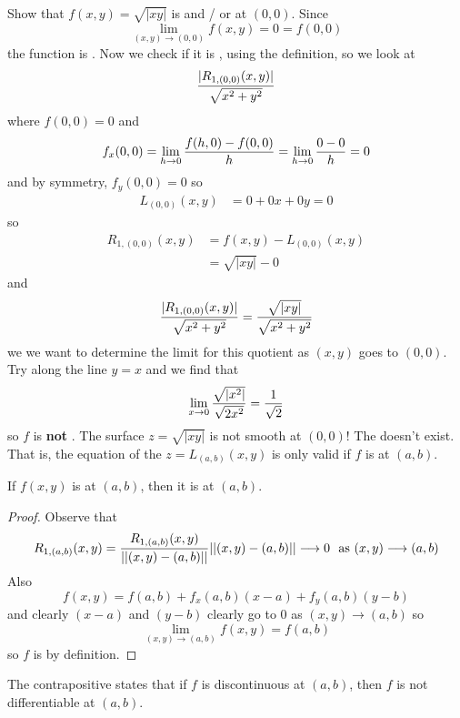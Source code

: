 \documentclass[english, 11pt]{article}
\begin{document}
  \begin{exmp}
    Show that $f(x,y) = \sqrt{|xy|}$ is  and / or  at $(0,0)$. Since
    \[ \lim_{(x,y) \rightarrow (0,0)} f(x,y) = 0 = f(0,0) \]
    the function is . Now we check if it is , using the definition, so we look at
    \[ \frac{|R_{1,(0,0)}(x,y)|}{\sqrt{x^2 + y^2}} \]
    where $f(0,0) = 0$ and
    \[ f_x(0,0) = \lim_{h \rightarrow 0} \frac{f(h,0) - f(0,0)}{h} = \lim_{h \rightarrow 0} \frac{0 - 0}{h} = 0 \]
    and by symmetry, $f_y(0,0) = 0$ so
    \begin{align*}
      L_{(0,0)}(x,y)& = 0 + 0x + 0y = 0
    \end{align*}
    so
    \begin{align*}
      R_{1,(0,0)}(x,y) & = f(x,y) - L_{(0,0)}(x,y) \\
                       & = \sqrt{|xy|} - 0
    \end{align*}
    and
    \[ \frac{|R_{1,(0,0)}(x,y)|}{\sqrt{x^2 + y^2}} = \frac{\sqrt{|xy|}}{\sqrt{x^2 + y^2}} \]
    we we want to determine the limit for this quotient as $(x,y)$ goes to $(0,0)$. Try along the line $y = x$ and we find that
    \[ \lim_{x \rightarrow 0} \frac{\sqrt{|x^2|}}{\sqrt{2x^2}} = \frac{1}{\sqrt{2}} \]
    so $f$ is \textbf{not} . The surface $z = \sqrt{|xy|}$ is not smooth at $(0,0)$! The  doesn't exist. That is, the equation of the  $z = L_{(a,b)}(x,y)$ is only valid if $f$ is  at $(a,b)$.
  \end{exmp}

  \begin{thrm}
    If $f(x,y)$ is  at $(a,b)$, then it is  at $(a,b)$.
  \end{thrm}

  \begin{proof}
    Observe that
    \[ R_{1,(a,b)}(x,y) = \frac{R_{1,(a,b)}(x,y)}{||(x,y) - (a,b)||}||(x,y) - (a,b)|| \longrightarrow 0 \mbox{ \ as $(x,y)\longrightarrow (a,b)$} \]
    Also
  \[ f(x,y) = f(a,b) + f_x(a,b)(x-a) + f_y(a,b)(y-b) \]
  and clearly $(x-a)$ and $(y-b)$ clearly go to 0 as $(x,y) \rightarrow (a,b)$ so
  \[  \lim_{(x,y) \rightarrow (a,b)} f(x,y) = f(a,b) \]
  so $f$ is  by definition.
  \end{proof}
\begin{note}
  The contrapositive states that if $f$ is discontinuous at $(a,b)$, then $f$ is not differentiable at $(a,b)$.
\end{note}
\end{document}
